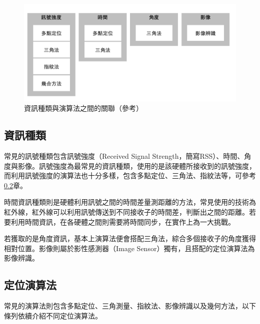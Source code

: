     \begin{figure}[htpb]
        \centering
        \includegraphics[width=12cm]{ch2pic/method_sort.png}
        \caption{資訊種類與演算法之間的關聯（參考\cite{survey_light2018}）}
        \label{pic:method_sort}
    \end{figure}
    
    \subsection{資訊種類}

    常見的訊號種類包含訊號強度（Received Signal Strength，簡寫RSS）、時間、角度與影像。訊號強度為最常見的資訊種類\cite{survey_indoor2018}，使用的是該硬體所接收到的訊號強度，而利用訊號強度的演算法也十分多樣，包含多點定位、三角法、指紋法等，可參考\ref{chp:method-algorithm}章。

    時間資訊種類則是硬體利用訊號之間的時間差量測距離的方法，常見使用的技術為紅外線，紅外線可以利用訊號傳送到不同接收子的時間差，判斷出之間的距離。若要利用時間資訊，在各硬體之間則需要將時間同步，在實作上為一大挑戰\cite{survey_indoor2014}。

    若獲取的是角度資訊，基本上演算法便會搭配三角法，綜合多個接收子的角度獲得相對位置。影像則屬於影性感測器（Image Sensor）獨有，且搭配的定位演算法為影像辨識。


    \subsection{定位演算法}
    \label{chp:method-algorithm}

    常見的演算法則包含多點定位、三角測量、指紋法、影像辨識以及幾何方法，以下條列依續介紹不同定位演算法。


